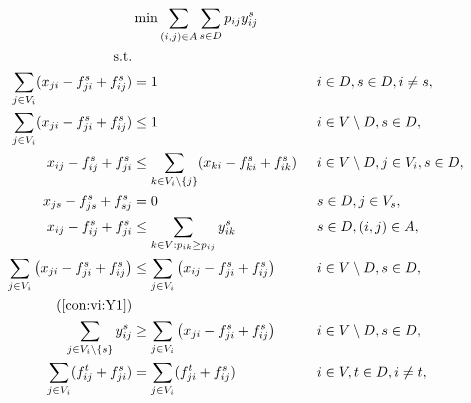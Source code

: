 \begin{subequations}
\begin{flalign}
\label{objective:mfinpf2} &\makebox[0pt][l]{$\displaystyle{}\min \sum\limits_{(i,j) \in A} \sum\limits_{s \in D} p_{ij} y^s_{ij} $}  & &&\\ \notag  
   \text{s.t.}&  &  &                 && \\	\
     \label{con:mfinpf2:arrowFromDest}  \sum\limits_{j\in V_i}(x_{ji}-f^s_{ji}+f^s_{ij})          & = 1       			&& i\in D, s\in D, i \neq s, && \\ 
		  \label{con:mfinpf2:arrowFromNonDestB}  \sum\limits_{j \in V_i}(x_{ji}-f^s_{ji}+f^s_{ij})  &\leq 1 && i\in V \setminus D, s\in D,   &&\\		
		  \label{con:mfinpf2:arrowFromNonDestA}  x_{ij}-f^s_{ij}+f^s_{ji}  & \leq \sum\limits_{k \in V_i\setminus\{j\}}(x_{ki}-f^s_{ki}+f^s_{ik}) &&
		  i\in V \setminus D,j\in V_i, s\in D,   &&\\		  
      \label{con:mfinpf2:startInSource}  x_{js} - f^s_{js}+f^s_{sj}    & = 0       			&&  s\in D, j\in V_s, &&\\		 
		  \label{con:mfinpf2:yvar}  x_{ij}-f^s_{ij}+f^s_{ji} & \leq \sum\limits_{k\in V:p_{ik}\geq p_{ij}}y^s_{ik} && s\in D, (i,j)\in A, 		&&\\ 
  \label{con:mfinpf2:extraCon} \sum\limits_{j\in V_{i}}\left(x_{ji}-f^s_{ji}+f^s_{ij}\right) & \leq \sum\limits_{j\in V_{i}}\left(x_{ij}-f^s_{ji}+f^s_{ij}\right)  && 	i\in V\setminus D, s\in D, \\	
   \notag  \text(\ref{con:vi:Y1})&  &  &                 && \\	\
\label{con:mfinpf2:sumYImpSumXTrans} \sum\limits_{j\in V_i\setminus\{s\} }y^{s}_{ij} & \geq \sum\limits_{j\in V_i} \left( x_{ji}-f^s_{ji}+f^s_{ij} \right) \quad\quad &&  i\in V\setminus D, s\in D, \\		   
		 		 \label{con:mfinpf2:flowNormal}  \sum\limits_{\substack{ j\in V_i }}(f^t_{ij}+f^s_{ji})&=\sum\limits_{\substack{j\in V_i }}(f^t_{ji}+f^s_{ij})     			&& i\in V, t\in D, i \neq t, &&\\	

\end{flalign}
\end{subequations}
